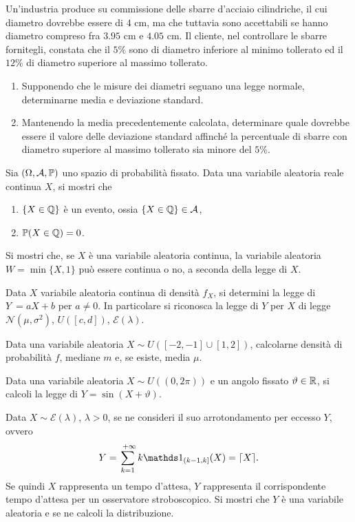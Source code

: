 Un'industria produce su commissione delle sbarre d'acciaio cilindriche, il cui diametro dovrebbe essere di $4$ cm, ma che tuttavia sono accettabili se hanno diametro compreso fra $3.95$ cm e $4.05$ cm. Il cliente, nel controllare le sbarre fornitegli, constata che il $5\%$ sono di diametro inferiore al minimo tollerato ed il $12\%$ di diametro superiore al massimo tollerato.
\begin{enumerate}
\item Supponendo che le misure dei diametri seguano una legge normale, determinarne media e deviazione standard.
\item Mantenendo la media precedentemente calcolata, determinare quale dovrebbe essere il valore delle deviazione standard affinché la percentuale di sbarre con diametro superiore al massimo tollerato sia minore del $5\%$.
\end{enumerate}
\Esercizio{}

Sia $(\Omega,\mathcal{A},\mathbb{P})$ uno spazio di probabilità fissato. Data una variabile aleatoria reale continua $X$, si mostri che
\begin{enumerate}
\item $\{X\in \mathbb{Q}\}$ è un evento, ossia $\{X\in \mathbb{Q}\} \in \mathcal{A}$,
\item $\mathbb{P}(X\in \mathbb{Q}) =0$.
\end{enumerate}
\Esercizio{}

Si mostri che, se $X$ è una variabile aleatoria continua, la variabile aleatoria $W=\min\{X,1\}$ può essere continua o no, a seconda della legge di $X$.
\Esercizio{}

Data $X$ variabile aleatoria continua di densità $f_{X}$, si determini la legge di $Y\ =aX+b$ per $a\neq 0$. In particolare si riconosca la legge di $Y$ per $X$ di legge $\mathcal{N}\left(\mu ,\sigma^{2}\right)$, $U([c,d])$, $\mathcal{E}(\lambda)$.
\Esercizio{}

Data una variabile aleatoria $X\sim U([-2,-1] \cup [1,2])$, calcolarne densità di probabilità $f$, mediane $m$ e, se esiste, media $\mu $.
\Esercizio{$\star$}

Data una variabile aleatoria $X\sim U((0,2\pi))$ e un angolo fissato $\vartheta \in \mathbb{R}$, si calcoli la legge di $Y=\sin(X+\vartheta)$.
\Esercizio{}

Data $X\sim \mathcal{E}(\lambda)$, $\lambda  >0$, se ne consideri il suo arrotondamento per eccesso $Y$, ovvero
\begin{equation*}
Y=\sum\limits_{k=1}^{\ +\infty } k\Ind_{(k-1,k]}(X) =\lceil X\rceil .
\end{equation*}
Se quindi $X$ rappresenta un tempo d'attesa, $Y$ rappresenta il corrispondente tempo d'attesa per un osservatore stroboscopico. Si mostri che $Y$ è una variabile aleatoria e se ne calcoli la distribuzione.
\Esercizio{}

